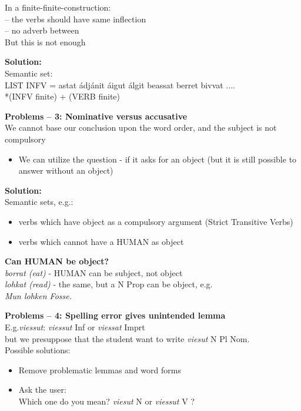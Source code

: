 \documentclass[landscape,norsk,11pt]{seminar}
\begin{document}
\begin{slide}
In a finite-finite-construction:\\ -- the verbs should have same inflection\\
-- no adverb between\\
But this is not enough

\newslide
\textbf{Solution:} \\
Semantic set:\\
LIST INFV =  astat ádjánit áigut álgit beassat berret bivvat .... \\
\textnormal{*(INFV finite) + (VERB finite)}


\newslide
\textbf{Problems -- 3: Nominative versus accusative} \\
We cannot base our conclusion upon the word order, and the subject is not compulsory
\begin{itemize}
\item We can utilize the question - if it asks for an object (but it is still possible to answer without an object)
\end{itemize}
\newslide
\textbf{Solution:} \\
Semantic sets, e.g.: 
\begin{itemize}
\item verbs which have object as a compulsory argument (Strict Transitive Verbs)
\item verbs which cannot have a HUMAN as object
\end{itemize}

\newslide
\textbf{Can HUMAN be object?} \\

 \textit{borrat (eat)}   - HUMAN can be subject, not object \\
 
  \textit{lohkat (read)}  - the same, but a N Prop can be object, e.g.  \\ \textit{Mun lohken Fosse.}


\newslide
\textbf{Problems -- 4: Spelling error gives unintended lemma} \\
E.g.\textit{viessut}: \textit{viessut} Inf or \textit{viessat} Imprt \\
but we presuppose that the student want to write \textit{viesut} N Pl Nom. \\
Possible solutions:

\begin{itemize}
\item{Remove problematic lemmas and word forms}
\item{Ask the user: \\ Which one do you mean? \textit{viesut}  N or \textit{viessut} V }?
\end{itemize}



\end{slide}
\end{document}
